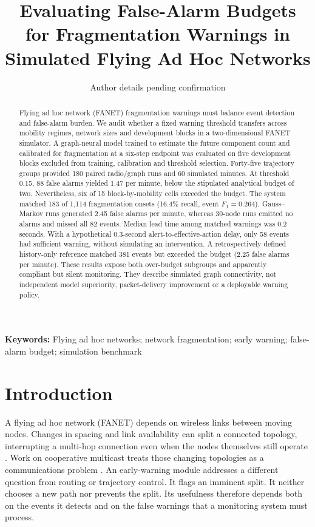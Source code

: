 \documentclass[10pt,a4paper]{article}
\begin{document}
\title{Evaluating False-Alarm Budgets for Fragmentation Warnings in Simulated Flying Ad Hoc Networks}

\author{Author details pending confirmation}
\date{}

\maketitle
\begin{abstract}
Flying ad hoc network (FANET) fragmentation warnings must balance event detection and false-alarm burden. We audit whether a fixed warning threshold transfers across mobility regimes, network sizes and development blocks in a two-dimensional FANET simulator. A graph-neural model trained to estimate the future component count and calibrated for fragmentation at a six-step endpoint was evaluated on five development blocks excluded from training, calibration and threshold selection. Forty-five trajectory groups provided 180 paired radio/graph runs and 60 simulated minutes. At threshold 0.15, 88 false alarms yielded 1.47 per minute, below the stipulated analytical budget of two. Nevertheless, six of 15 block-by-mobility cells exceeded the budget. The system matched 183 of 1,114 fragmentation onsets (16.4\% recall, event $F_1=0.264$). Gauss--Markov runs generated 2.45 false alarms per minute, whereas 30-node runs emitted no alarms and missed all 82 events. Median lead time among matched warnings was 0.2 seconds. With a hypothetical 0.3-second alert-to-effective-action delay, only 58 events had sufficient warning, without simulating an intervention. A retrospectively defined history-only reference matched 381 events but exceeded the budget (2.25 false alarms per minute). These results expose both over-budget subgroups and apparently compliant but silent monitoring. They describe simulated graph connectivity, not independent model superiority, packet-delivery improvement or a deployable warning policy.

\end{abstract}
\noindent\textbf{Keywords:} Flying ad hoc networks; network fragmentation; early warning; false-alarm budget; simulation benchmark


\section{Introduction}\label{sec:intro}

A flying ad hoc network (FANET) depends on wireless links between moving nodes. Changes in spacing and link availability can split a connected topology, interrupting a multi-hop connection even when the nodes themselves still operate \cite{BEKMEZCI20131254}. Work on cooperative multicast treats those changing topologies as a communications problem \cite{cocoma2024}. An early-warning module addresses a different question from routing or trajectory control. It flags an imminent split. It neither chooses a new path nor prevents the split. Its usefulness therefore depends both on the events it detects and on the false warnings that a monitoring system must process.
\end{document}
